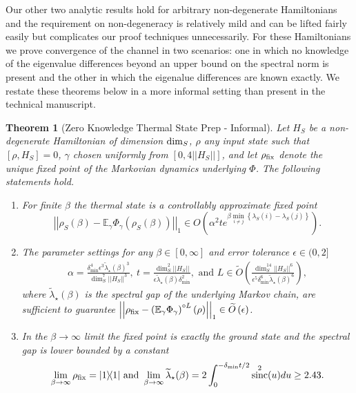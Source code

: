 \documentclass[11pt]{article}
\newtheorem{theorem}{Theorem}
\newcommand{\ketbra}[2]{| #1\rangle\! \langle #2|}
\newcommand{\norm}[1]{\left|\left| #1 \right|\right|}
\newcommand{\set}[1]{\left\{ #1 \right\}}
\newcommand{\EE}{\mathbb{E}}
\newcommand{\bigo}[1]{O\left(#1\right)}
\newcommand{\bigotilde}[1]{\widetilde{O} \left( #1 \right)}
\DeclareMathOperator{\sinc}{sinc}
\begin{document}
Our other two analytic results hold for arbitrary non-degenerate Hamiltonians and the requirement on non-degeneracy is relatively mild and can be lifted fairly easily but complicates our proof techniques unnecessarily. For these Hamiltonians we prove convergence of the channel in two scenarios: one in which no knowledge of the eigenvalue differences beyond an upper bound on the spectral norm is present and the other in which the eigenalue differences are known exactly. We restate these theorems below in a more informal setting than present in the technical manuscript.
\begin{theorem}[Zero Knowledge Thermal State Prep - Informal] \label{thm:zero_knowledge}
    Let $H_S$ be a non-degenerate Hamiltonian of dimension ${\rm dim}_S$, $\rho$ any input state such that $[\rho, H_S] = 0$, $\gamma$ chosen uniformly from $[0, 4 \norm{H_S}]$, and
    let $\rho_{\rm fix}$ denote the unique fixed point of the Markovian dynamics underlying $\Phi$. The following statements hold.
    \begin{enumerate}
\item For finite $\beta$ the thermal state is a controllably approximate fixed point
    \begin{equation}
        \norm{\rho_S(\beta) - \EE_\gamma \Phi_\gamma(\rho_S(\beta))}_1 \in \bigo{\alpha^2 t e^{\beta \min_{i \neq j} \set{\lambda_S(i) - \lambda_S(j)}}}.
    \end{equation}
    \item   The parameter settings for any $\beta\in [0,\infty]$ and error tolerance $\epsilon \in (0,2]$
    \begin{align}
        \alpha = \frac{\delta_{\min}^4 \epsilon^{3} \widetilde{\lambda}_\star(\beta)^{3}}{\dim_S^7 \norm{H_S}^3}, ~t = \frac{\dim_S^2 \norm{H_S}}{\epsilon \widetilde{\lambda}_\star(\beta) \delta_{\min}^2}, \text{ and } L \in \bigotilde{\frac{\dim_S^{14} \norm{H_S}^6}{\epsilon^5 \delta_{\min}^6 \widetilde{\lambda}_\star(\beta)^{6} }},
    \end{align}
    where $\widetilde{\lambda}_\star(\beta)$ is the spectral gap of the underlying Markov chain, are sufficient to guarantee $\norm{\rho_{\rm fix} - \left(\EE_\gamma \Phi_\gamma \right)^{\circ L}(\rho)}_1 \in \bigotilde{\epsilon}$.
   \item    In the $\beta \to \infty$ limit the fixed point is exactly the ground state and the spectral gap is lower bounded by a constant
    \begin{equation}
        \lim_{\beta \to \infty} \rho_{\rm fix} = \ketbra{1}{1} \text{ and } \lim_{\beta \to \infty} \widetilde{\lambda}_\star(\beta) = 2 \int_{0}^{-\delta_{\min}t/2} \sinc^2(u) du \ge 2.43.
        \end{equation}

    \end{enumerate}
\end{theorem}
\end{document}
